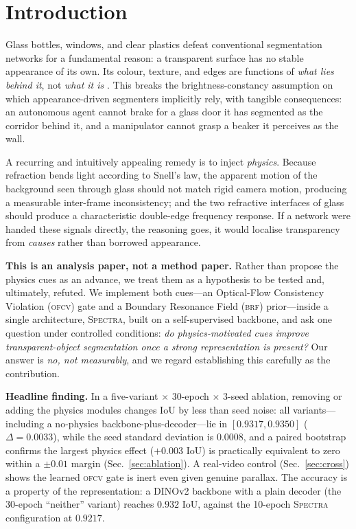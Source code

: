 \documentclass{article}
\newcommand{\spectra}{\textsc{Spectra}}
\newcommand{\ofcv}{\textsc{ofcv}}
\newcommand{\brf}{\textsc{brf}}
\newcommand{\dinov}{DINOv2}
\newcommand{\iou}{IoU}
\begin{document}
\section{Introduction}
Glass bottles, windows, and clear plastics defeat conventional segmentation
networks for a fundamental reason: a transparent surface has no stable
appearance of its own. Its colour, texture, and edges are functions of
\emph{what lies behind it}, not \emph{what it is} \cite{xie2020translab}. This
breaks the brightness-constancy assumption on which appearance-driven segmenters
implicitly rely, with tangible consequences: an autonomous agent cannot brake
for a glass door it has segmented as the corridor behind it, and a manipulator
cannot grasp a beaker it perceives as the wall.

A recurring and intuitively appealing remedy is to inject \emph{physics}.
Because refraction bends light according to Snell's law, the apparent motion of
the background seen through glass should not match rigid camera motion,
producing a measurable inter-frame inconsistency; and the two refractive
interfaces of glass should produce a characteristic double-edge frequency
response. If a network were handed these signals directly, the reasoning goes,
it would localise transparency from \emph{causes} rather than borrowed
appearance.

\textbf{This is an analysis paper, not a method paper.} Rather than propose the
physics cues as an advance, we treat them as a hypothesis to be tested and,
ultimately, refuted. We implement both cues---an Optical-Flow Consistency
Violation (\ofcv) gate and a Boundary Resonance Field (\brf) prior---inside a
single architecture, \spectra, built on a self-supervised backbone, and ask one
question under controlled conditions: \emph{do physics-motivated cues improve
transparent-object segmentation once a strong representation is present?} Our
answer is \emph{no, not measurably}, and we regard establishing this carefully
as the contribution.

\textbf{Headline finding.} In a five-variant $\times$ 30-epoch $\times$ 3-seed
ablation, removing or adding the physics modules changes \iou{} by less than
seed noise: all variants---including a no-physics backbone-plus-decoder---lie in
$[0.9317,0.9350]$ ($\Delta=0.0033$), while the seed standard deviation is
$0.0008$, and a paired bootstrap confirms the largest physics effect
($+0.003$ \iou) is practically equivalent to zero within a $\pm0.01$ margin
(Sec.~\ref{sec:ablation}). A real-video control (Sec.~\ref{sec:cross})
shows the learned \ofcv{} gate is inert even given genuine parallax. The
accuracy is a property of the representation: a \dinov{} backbone with a plain
decoder (the 30-epoch ``neither'' variant) reaches $0.932$ \iou, against the
10-epoch \spectra{} configuration at $0.9217$.
\end{document}
